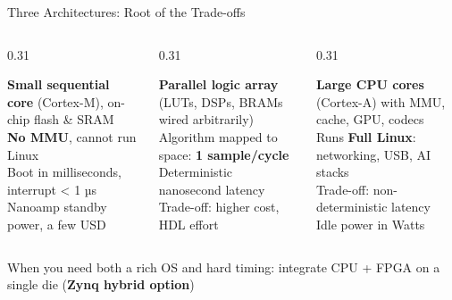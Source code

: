 \begin{frame}{Three Architectures: Root of the Trade-offs}
\begin{columns}[T]
\begin{column}{0.31\linewidth}\centering
{}
\raggedright\MCU\par\smallskip\footnotesize
\textbf{Small sequential core} (Cortex-M), on-chip flash \& SRAM\\
\textbf{No MMU}, cannot run Linux\\
Boot in milliseconds, interrupt < 1 µs\\
Nanoamp standby power, a few USD
\end{column}
\begin{column}{0.31\linewidth}\centering
{}
\raggedright\FPGA\par\smallskip\footnotesize
\textbf{Parallel logic array} (LUTs, DSPs, BRAMs wired arbitrarily)\\
Algorithm mapped to space: \textbf{1 sample/cycle}\\
Deterministic nanosecond latency\\
Trade-off: higher cost, HDL effort
\end{column}
\begin{column}{0.31\linewidth}\centering
{}
\raggedright\SoC\par\smallskip\footnotesize
\textbf{Large CPU cores} (Cortex-A) with MMU, cache, GPU, codecs\\
Runs \textbf{Full Linux}: networking, USB, AI stacks\\
Trade-off: non-deterministic latency\\
Idle power in Watts
\end{column}
\end{columns}
\vfill
\centering\scriptsize\textcolor{cInk2}{When you need both a rich OS and hard timing: integrate CPU + FPGA on a single die (\textbf{Zynq hybrid option})}
\end{frame}


